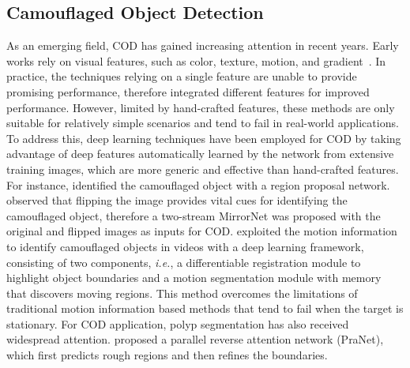 \documentclass{article}
\def\ie{\emph{i.e.}}
\begin{document}
\subsection{Camouflaged Object Detection}
As an emerging field, COD has gained increasing attention in recent years.
Early works rely on visual features, such as color, texture, motion, and gradient~\cite{survey}.
In practice, the techniques relying on a single feature are unable to provide promising performance, therefore \cite{comb1} integrated different features for improved performance.
However, limited by hand-crafted features, these methods are only suitable for relatively simple scenarios and tend to fail in real-world applications.
To address this, deep learning techniques have been employed for COD by taking advantage of deep features automatically learned by the network from extensive training images, which are more generic and effective than hand-crafted features.
For instance, \cite{cdetection} identified the camouflaged object with a region proposal network. \cite{mirrornet} observed that flipping the image provides vital cues for identifying the camouflaged object, therefore a two-stream MirrorNet was proposed with the original and flipped images as inputs for COD.
\cite{video} exploited the motion information to identify camouflaged objects in videos with a deep learning framework, consisting of two components, \ie, a differentiable registration module to highlight object boundaries and a motion segmentation module with memory that discovers moving regions.
This method overcomes the limitations of traditional motion information based methods that tend to fail when the target is stationary. For COD application, polyp segmentation has also received widespread attention. \cite{pranet} proposed a parallel reverse attention network (PraNet), which first predicts rough regions and then refines the boundaries.
\end{document}
